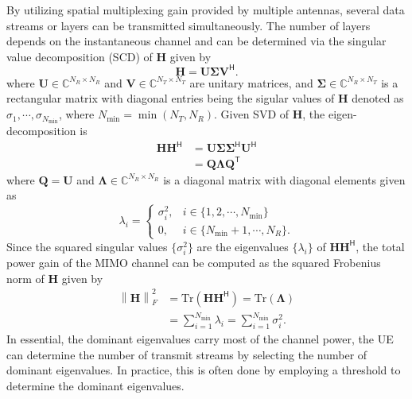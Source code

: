 \documentclass[a4paper,12pt]{article}%
\newcommand{\norm}[1]{\left\lVert#1\right\rVert} %
\begin{document}
By utilizing spatial multiplexing gain provided by multiple antennas, several data streams or layers can be transmitted simultaneously. The number of layers depends on the instantaneous channel and can be determined via the singular value decomposition (SCD) of $\mathbf{H}$ given by
\begin{equation}
\mathbf{H}=\mathbf{U} \boldsymbol{\Sigma} \mathbf{V}^\mathsf{H}.
\end{equation}
where $\mathbf{U} \in \mathbb{C}^{N_R \times N_R}$ and $\mathbf{V} \in \mathbb{C}^{N_T \times N_T}$ are unitary matrices, and $\boldsymbol{\Sigma}\in \mathbb{C}^{N_R \times N_T}$ is a rectangular matrix with diagonal entries being the sigular values of $\mathbf{H}$ denoted as $\sigma_1, \cdots, \sigma_{N_{\min}}$, where $N_{\min}=\min(N_T,N_R).$
Given SVD of $\mathbf{H}$, the eigen-decomposition is
\begin{align}
\mathbf{H}\mathbf{H}^\mathsf{H}&=\mathbf{U}\boldsymbol{\Sigma} \boldsymbol{\Sigma}^\mathsf{H}\mathbf{U}^\mathsf{H} \nonumber \\
&= \mathbf{Q} \boldsymbol{\Lambda} \mathbf{Q}^{\mathsf{T}}
\end{align}
where $\mathbf{Q}=\mathbf{U}$ and $\boldsymbol{\Lambda}\in \mathbb{C}^{N_R\times N_R}$ is a diagonal matrix with diagonal elements given as
\begin{equation}
\lambda_i = \begin{cases} \sigma^2_i, & i\in\{1,2,\cdots,N_{\min}\} \\
0, & i \in \{N_{\min}+1, \cdots, N_R \}.
\end{cases}
\end{equation}
Since the squared singular values $\{\sigma_i^2\}$ are the eigenvalues $\{\lambda_i\}$ of $\mathbf{H}\mathbf{H}^{\mathsf{H}}$, the total power gain of the MIMO channel can be computed as the squared Frobenius norm of $\mathbf{H}$ given by
\begin{align}
\norm{\mathbf{H}}_F^2 &= \text{Tr}(\mathbf{H}\mathbf{H}^\mathsf{H}) = \text{Tr}(\boldsymbol{\Lambda}) \nonumber \\
&= \sum_{i=1}^{N_{\min}} \lambda_i = \sum_{i=1}^{N_{\min}} \sigma_i^2.
\end{align}
In essential, the dominant eigenvalues carry most of the channel power, the UE can determine the number of transmit streams by selecting the number of dominant eigenvalues. In practice, this is often done by employing a threshold to determine the dominant eigenvalues.

\end{document}
